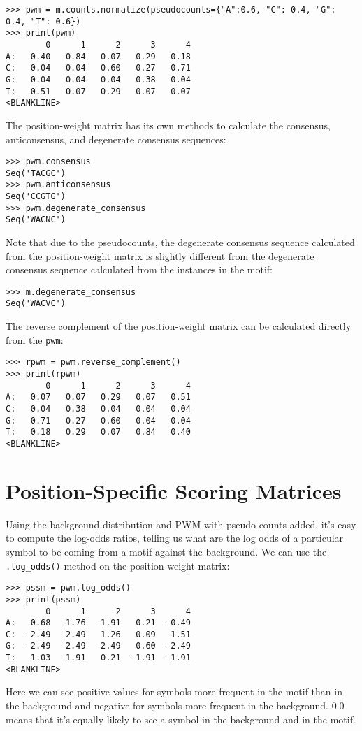 \begin{verbatim}
>>> pwm = m.counts.normalize(pseudocounts={"A":0.6, "C": 0.4, "G": 0.4, "T": 0.6})
>>> print(pwm)
        0      1      2      3      4
A:   0.40   0.84   0.07   0.29   0.18
C:   0.04   0.04   0.60   0.27   0.71
G:   0.04   0.04   0.04   0.38   0.04
T:   0.51   0.07   0.29   0.07   0.07
<BLANKLINE>
\end{verbatim}
The position-weight matrix has its own methods to calculate the
consensus, anticonsensus, and degenerate consensus sequences:

\begin{verbatim}
>>> pwm.consensus
Seq('TACGC')
>>> pwm.anticonsensus
Seq('CCGTG')
>>> pwm.degenerate_consensus
Seq('WACNC')
\end{verbatim}
Note that due to the pseudocounts, the degenerate consensus sequence
calculated from the position-weight matrix is slightly different
from the degenerate consensus sequence calculated from the instances
in the motif:

\begin{verbatim}
>>> m.degenerate_consensus
Seq('WACVC')
\end{verbatim}
The reverse complement of the position-weight matrix can be calculated directly from the \verb+pwm+:

\begin{verbatim}
>>> rpwm = pwm.reverse_complement()
>>> print(rpwm)
        0      1      2      3      4
A:   0.07   0.07   0.29   0.07   0.51
C:   0.04   0.38   0.04   0.04   0.04
G:   0.71   0.27   0.60   0.04   0.04
T:   0.18   0.29   0.07   0.84   0.40
<BLANKLINE>
\end{verbatim}

\section{Position-Specific Scoring Matrices}

Using the background distribution and PWM with pseudo-counts added,
it's easy to compute the log-odds ratios, telling us what are the log
odds of a particular symbol to be coming from a motif against the
background. We can use the \verb|.log_odds()| method on the position-weight
matrix:

\begin{verbatim}
>>> pssm = pwm.log_odds()
>>> print(pssm)
        0      1      2      3      4
A:   0.68   1.76  -1.91   0.21  -0.49
C:  -2.49  -2.49   1.26   0.09   1.51
G:  -2.49  -2.49  -2.49   0.60  -2.49
T:   1.03  -1.91   0.21  -1.91  -1.91
<BLANKLINE>
\end{verbatim}
Here we can see positive values for symbols more frequent in the motif
than in the background and negative for symbols more frequent in the
background. $0.0$ means that it's equally likely to see a symbol in the
background and in the motif.

